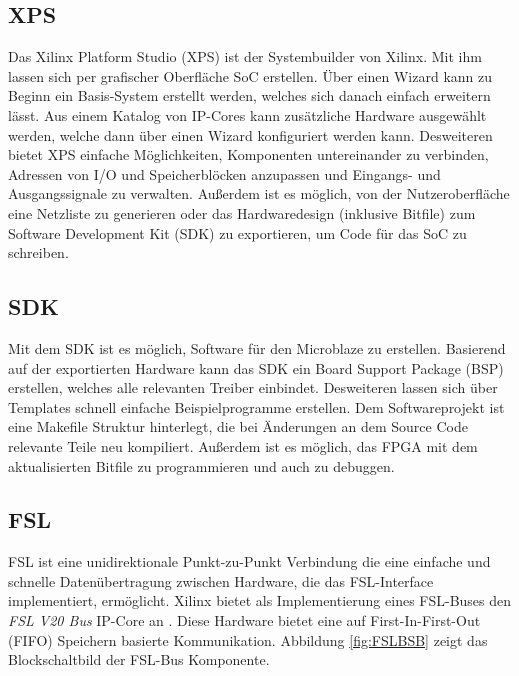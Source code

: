 \subsection{XPS}
Das Xilinx Platform Studio (XPS) ist der Systembuilder von Xilinx. Mit ihm lassen sich per grafischer Oberfläche SoC erstellen. Über einen Wizard kann zu Beginn ein Basis-System erstellt werden, welches sich danach einfach erweitern lässt. Aus einem Katalog von IP-Cores kann zusätzliche Hardware ausgewählt werden, welche dann über einen Wizard konfiguriert werden kann. Desweiteren bietet XPS einfache Möglichkeiten, Komponenten untereinander zu verbinden, Adressen von I/O und Speicherblöcken anzupassen und Eingangs- und Ausgangssignale zu verwalten. Außerdem ist es möglich, von der Nutzeroberfläche eine Netzliste zu generieren oder das Hardwaredesign (inklusive Bitfile) zum Software Development Kit (SDK) zu exportieren, um Code für das SoC zu schreiben. \cite{MBTOOLS}
\subsection{SDK}
Mit dem SDK ist es möglich, Software für den Microblaze zu erstellen. Basierend auf der exportierten Hardware kann das SDK ein Board Support Package (BSP) erstellen, welches alle relevanten Treiber einbindet. Desweiteren lassen sich über Templates schnell einfache Beispielprogramme erstellen. Dem Softwareprojekt ist eine Makefile Struktur hinterlegt, die bei Änderungen an dem Source Code relevante Teile neu kompiliert. Außerdem ist es möglich, das FPGA mit dem aktualisierten Bitfile zu programmieren und auch zu debuggen. \cite{MBTOOLS}

\subsection{FSL}
FSL ist eine unidirektionale Punkt-zu-Punkt Verbindung die eine einfache und schnelle Datenübertragung zwischen Hardware, die das FSL-Interface implementiert, ermöglicht. Xilinx bietet als Implementierung eines FSL-Buses den \textit{FSL V20 Bus} IP-Core an \cite{FSL_CORE}. Diese Hardware bietet eine auf First-In-First-Out (FIFO) Speichern basierte Kommunikation. Abbildung \ref{fig:FSLBSB} zeigt das Blockschaltbild der FSL-Bus Komponente.

